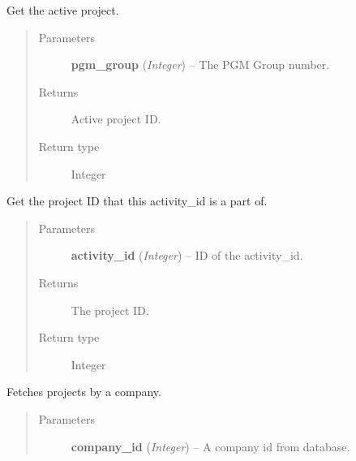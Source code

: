 \documentclass[letterpaper,10pt,english]{sphinxmanual}
\begin{document}

\begin{fulllineitems}
\label{controller:controller.project.get_active_project}
Get the active project.
\begin{quote}\begin{description}
\item[{Parameters}] \leavevmode
\textbf{pgm\_group} (\emph{Integer}) -- The PGM Group number.

\item[{Returns}] \leavevmode
Active project ID.

\item[{Return type}] \leavevmode
Integer

\end{description}\end{quote}

\end{fulllineitems}


\begin{fulllineitems}
\label{controller:controller.project.get_project_id_by_activity}
Get the project ID that this activity\_id is a part of.
\begin{quote}\begin{description}
\item[{Parameters}] \leavevmode
\textbf{activity\_id} (\emph{Integer}) -- ID of the activity\_id.

\item[{Returns}] \leavevmode
The project ID.

\item[{Return type}] \leavevmode
Integer

\end{description}\end{quote}

\end{fulllineitems}


\begin{fulllineitems}
\label{controller:controller.project.get_projects_by_company}
Fetches projects by a company.
\begin{quote}\begin{description}
\item[{Parameters}] \leavevmode
\textbf{company\_id} (\emph{Integer}) -- A company id from database.

\end{description}\end{quote}

\end{fulllineitems}
\end{document}
